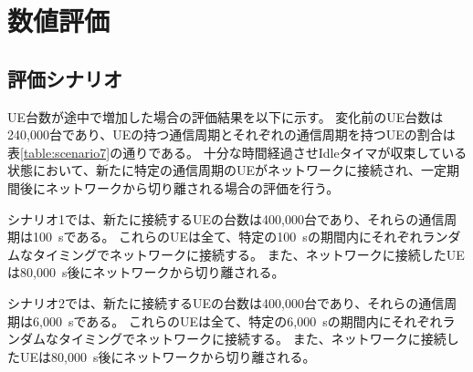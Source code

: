 \documentclass[a4j]{ujarticle}
\begin{document}

\section{数値評価}
\subsection{評価シナリオ}
UE台数が途中で増加した場合の評価結果を以下に示す。
変化前のUE台数は240,000台であり、UEの持つ通信周期とそれぞれの通信周期を持つUEの割合は表\ref{table:scenario7}の通りである。
十分な時間経過させIdleタイマが収束している状態において、新たに特定の通信周期のUEがネットワークに接続され、一定期間後にネットワークから切り離される場合の評価を行う。


シナリオ1では、新たに接続するUEの台数は400,000台であり、それらの通信周期は100~sである。
これらのUEは全て、特定の100~sの期間内にそれぞれランダムなタイミングでネットワークに接続する。
また、ネットワークに接続したUEは80,000~s後にネットワークから切り離される。


シナリオ2では、新たに接続するUEの台数は400,000台であり、それらの通信周期は6,000~sである。
これらのUEは全て、特定の6,000~sの期間内にそれぞれランダムなタイミングでネットワークに接続する。
また、ネットワークに接続したUEは80,000~s後にネットワークから切り離される。
\end{document}
